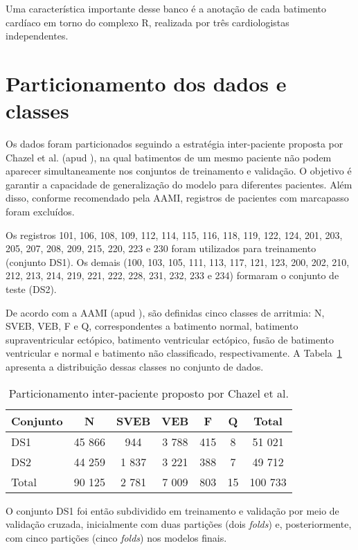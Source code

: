 \documentclass[
    12pt,                %
    openright,           %
    oneside,             %
    a4paper,             %
    brazil               %
]{abntex2}
\begin{document}
Uma característica importante desse banco é a anotação de cada batimento cardíaco em torno do complexo R, realizada por três cardiologistas independentes.

\section{Particionamento dos dados e classes}
\label{sec:particionamento}

Os dados foram particionados seguindo a estratégia inter-paciente proposta por Chazel et al. (apud ), na qual batimentos de um mesmo paciente não podem aparecer simultaneamente nos conjuntos de treinamento e validação. O objetivo é garantir a capacidade de generalização do modelo para diferentes pacientes. Além disso, conforme recomendado pela AAMI, registros de pacientes com marcapasso foram excluídos.  

Os registros 101, 106, 108, 109, 112, 114, 115, 116, 118, 119, 122, 124, 201, 203, 205, 207, 208, 209, 215, 220, 223 e 230 foram utilizados para treinamento (conjunto DS1). Os demais (100, 103, 105, 111, 113, 117, 121, 123, 200, 202, 210, 212, 213, 214, 219, 221, 222, 228, 231, 232, 233 e 234) formaram o conjunto de teste (DS2).

De acordo com a AAMI (apud ), são definidas cinco classes de arritmia: N, SVEB, VEB, F e Q, correspondentes a batimento normal, batimento supraventricular ectópico, batimento ventricular ectópico, fusão de batimento ventricular e normal e batimento não classificado, respectivamente. A Tabela~\ref{tab:particionamento} apresenta a distribuição dessas classes no conjunto de dados.

\begin{table}[htb]
\centering
\caption{Particionamento inter-paciente proposto por Chazel et al.}
\label{tab:particionamento}
\begin{tabular}{|l|c|c|c|c|c|c|}
\hline
Conjunto & N & SVEB & VEB & F & Q & Total \\ \hline
DS1 & 45 866 & 944 & 3 788 & 415 & 8 & 51 021 \\ \hline
DS2 & 44 259 & 1 837 & 3 221 & 388 & 7 & 49 712 \\ \hline
Total & 90 125 & 2 781 & 7 009 & 803 & 15 & 100 733 \\ \hline
\end{tabular}
\end{table}

O conjunto DS1 foi então subdividido em treinamento e validação por meio de validação cruzada, inicialmente com duas partições (dois \textit{folds}) e, posteriormente, com cinco partições (cinco \textit{folds}) nos modelos finais.  
\end{document}
